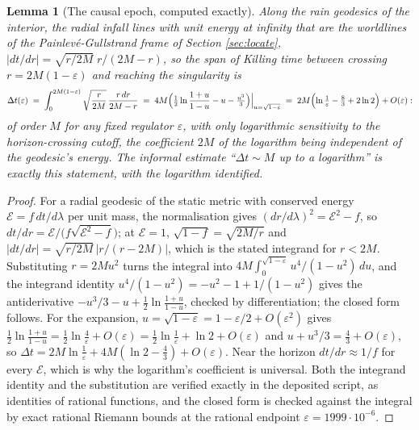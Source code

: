 \documentclass[11pt]{article}
\newtheorem{lemma}[theorem]{Lemma}
\theoremstyle{definition}
\begin{document}
\begin{lemma}[The causal epoch, computed exactly]\label{lem:epoch}
Along the rain geodesics of the interior, the radial infall lines with unit energy at infinity that are the worldlines of the Painlev\'e-Gullstrand frame of Section \ref{sec:locate}, $|dt/dr| = \sqrt{r/2M}\;r/(2M - r)$, so the span of Killing time between crossing $r = 2M(1 - \varepsilon)$ and reaching the singularity is
\[
\Delta t(\varepsilon) \;=\; \int_0^{2M(1-\varepsilon)} \sqrt{\frac{r}{2M}}\,\frac{r\,dr}{2M - r}
\;=\; 4M\Bigl(\tfrac12\ln\frac{1+u}{1-u} - u - \tfrac{u^{3}}{3}\Bigr)\Big|_{u = \sqrt{1-\varepsilon}}
\;=\; 2M\Bigl(\ln\tfrac{1}{\varepsilon} - \tfrac83 + 2\ln 2\Bigr) + O(\varepsilon) :
\]
of order $M$ for any fixed regulator $\varepsilon$, with only logarithmic sensitivity to the horizon-crossing cutoff, the coefficient $2M$ of the logarithm being independent of the geodesic's energy. The informal estimate ``$\Delta t \sim M$ up to a logarithm'' is exactly this statement, with the logarithm identified.
\end{lemma}

\begin{proof}
For a radial geodesic of the static metric with conserved energy $\mathcal{E} = f\,dt/d\lambda$ per unit mass, the normalisation gives $(dr/d\lambda)^{2} = \mathcal{E}^{2} - f$, so $dt/dr = \mathcal{E}/\bigl(f\sqrt{\mathcal{E}^{2} - f}\bigr)$; at $\mathcal{E} = 1$, $\sqrt{1 - f} = \sqrt{2M/r}$ and $|dt/dr| = \sqrt{r/2M}\,\bigl|r/(r - 2M)\bigr|$, which is the stated integrand for $r < 2M$. Substituting $r = 2Mu^{2}$ turns the integral into $4M\int_0^{\sqrt{1-\varepsilon}} u^{4}/(1 - u^{2})\,du$, and the integrand identity $u^{4}/(1 - u^{2}) = -u^{2} - 1 + 1/(1 - u^{2})$ gives the antiderivative $-u^{3}/3 - u + \tfrac12\ln\frac{1+u}{1-u}$, checked by differentiation; the closed form follows. For the expansion, $u = \sqrt{1 - \varepsilon} = 1 - \varepsilon/2 + O(\varepsilon^{2})$ gives $\tfrac12\ln\frac{1+u}{1-u} = \tfrac12\ln\frac{4}{\varepsilon} + O(\varepsilon) = \tfrac12\ln\tfrac1\varepsilon + \ln 2 + O(\varepsilon)$ and $u + u^{3}/3 = \tfrac43 + O(\varepsilon)$, so $\Delta t = 2M\ln\tfrac1\varepsilon + 4M(\ln 2 - \tfrac43) + O(\varepsilon)$. Near the horizon $dt/dr \approx 1/f$ for every $\mathcal{E}$, which is why the logarithm's coefficient is universal. Both the integrand identity and the substitution are verified exactly in the deposited script, as identities of rational functions, and the closed form is checked against the integral by exact rational Riemann bounds at the rational endpoint $\varepsilon = 1999 \cdot 10^{-6}$.
\end{proof}
\end{document}
